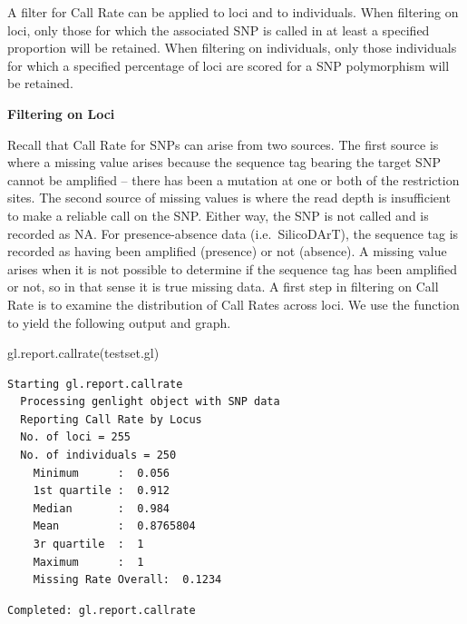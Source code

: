 \documentclass[
  letterpaper,
  DIV=11,
  numbers=noendperiod]{scrreprt}
\newenvironment{Shaded}{\begin{snugshade}}{\end{snugshade}}
\newcommand{\FunctionTok}[1]{\textcolor[rgb]{0.02,0.16,0.49}{#1}}
\newcommand{\NormalTok}[1]{\textcolor[rgb]{0.00,0.44,0.13}{#1}}
\let\textttOrig\texttt
\renewcommand{\texttt}[1]{\textttOrig{\color{blue}{#1}}}
\begin{document}
A filter for Call Rate can be applied to loci and to individuals. When
filtering on loci, only those for which the associated SNP is called in
at least a specified proportion will be retained. When filtering on
individuals, only those individuals for which a specified percentage of
loci are scored for a SNP polymorphism will be retained.

\textbf{Filtering on Loci}

Recall that Call Rate for SNPs can arise from two sources. The first
source is where a missing value arises because the sequence tag bearing
the target SNP cannot be amplified -- there has been a mutation at one
or both of the restriction sites. The second source of missing values is
where the read depth is insufficient to make a reliable call on the SNP.
Either way, the SNP is not called and is recorded as NA. For
presence-absence data (i.e.~SilicoDArT), the sequence tag is recorded as
having been amplified (presence) or not (absence). A missing value
arises when it is not possible to determine if the sequence tag has been
amplified or not, so in that sense it is true missing data. A first step
in filtering on Call Rate is to examine the distribution of Call Rates
across loci. We use the function \texttt{gl.report.callrate} to yield
the following output and graph.

\begin{Shaded}
\begin{Highlighting}[]
\FunctionTok{gl.report.callrate}\NormalTok{(testset.gl)}
\end{Highlighting}
\end{Shaded}

\begin{verbatim}
Starting gl.report.callrate 
  Processing genlight object with SNP data
  Reporting Call Rate by Locus
  No. of loci = 255 
  No. of individuals = 250 
    Minimum      :  0.056 
    1st quartile :  0.912 
    Median       :  0.984 
    Mean         :  0.8765804 
    3r quartile  :  1 
    Maximum      :  1 
    Missing Rate Overall:  0.1234 
\end{verbatim}

\begin{figure}[H]

{\centering \texttt{[image: basicfiltering\_files/figure-pdf/unnamed-chunk-4-1.pdf]}

}

\end{figure}

\begin{verbatim}
Completed: gl.report.callrate 
\end{verbatim}
\end{document}
